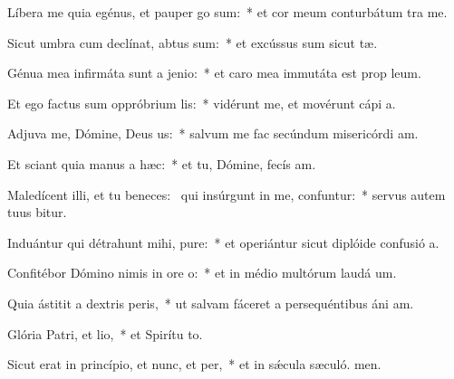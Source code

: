 \item Líbera me quia egénus, et pauper go sum:~* et cor meum conturbátum  tra me.
\item Sicut umbra cum declínat, abtus sum:~* et excússus sum sicut tæ.
\item Génua mea infirmáta sunt a jenio:~* et caro mea immutáta est prop leum.
\item Et ego factus sum oppróbrium lis:~* vidérunt me, et movérunt cápi a.
\item Adjuva me, Dómine, Deus us:~* salvum me fac secúndum misericórdi am.
\item Et sciant quia manus a hæc:~* et tu, Dómine, fecís am.
\item Maledícent illi, et tu beneces:~\pscross{} qui insúrgunt in me, confuntur:~* servus autem tuus bitur.
\item Induántur qui détrahunt mihi, pure:~* et operiántur sicut diplóide confusió a.
\item Confitébor Dómino nimis in ore o:~* et in médio multórum laudá um.
\item Quia ástitit a dextris peris,~* ut salvam fáceret a persequéntibus áni am.
\item Glória Patri, et lio,~* et Spirítu to.
\item Sicut erat in princípio, et nunc, et per,~* et in sǽcula sæculó. men.
